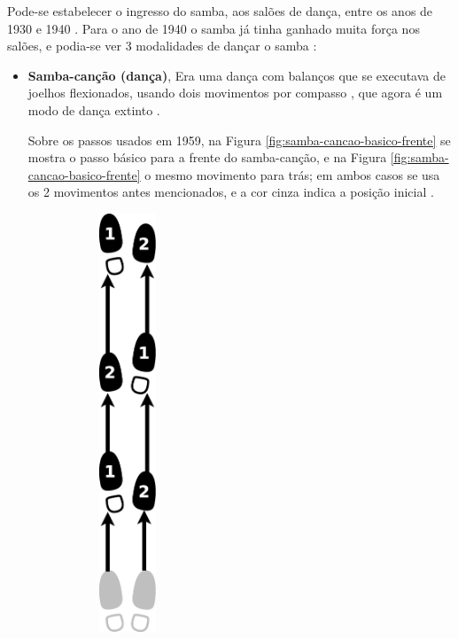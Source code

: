 Pode-se estabelecer o ingresso do samba, aos salões de dança, entre os anos de 1930 e 1940 \cite[pp. 140]{perna2002samba}.
Para o ano de 1940 o samba  já tinha ganhado muita força nos salões,
e podia-se ver 3 modalidades de dançar o samba \cite[pp. 58]{freitas1959danca} \cite[pp. 142-143]{perna2002samba}:
\begin{itemize}
\item \textbf{Samba-canção (dança)},
Era uma dança com balanços que se executava de joelhos flexionados,
usando dois movimentos por compasso \cite[pp. 58]{freitas1959danca} \cite[pp. 143]{perna2002samba}, 
que agora é um modo de dança extinto \cite[pp. 143]{perna2002samba}.

Sobre os passos usados em 1959, 
na Figura \ref{fig:samba-cancao-basico-frente} se mostra o passo básico para a frente do samba-canção,
e na  Figura \ref{fig:samba-cancao-basico-frente} o mesmo movimento para trás;
em ambos casos se usa os 2 movimentos antes mencionados, e a cor cinza indica a posição inicial \cite[pp. 59-60]{freitas1959danca}. 
\begin{figure}[h]
    \centering
    \begin{subfigure}[b]{0.3\textwidth}
        \centering
        \includegraphics[width=0.2\textwidth]{chapters/cap-historia-sambagafieira/samba-cancao-basico-frente.eps}

\end{subfigure}
\end{figure}
\end{itemize}
